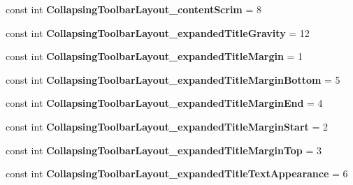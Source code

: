 \begin{DoxyCompactItemize}
const int {\bfseries Collapsing\+Toolbar\+Layout\+\_\+content\+Scrim} = 8
\item 
\mbox{\label{class_sample_app_1_1_droid_1_1_resource_1_1_styleable_a2bf064349cd2b9e1584c15a52f8f567f}} 
const int {\bfseries Collapsing\+Toolbar\+Layout\+\_\+expanded\+Title\+Gravity} = 12
\item 
\mbox{\label{class_sample_app_1_1_droid_1_1_resource_1_1_styleable_a37314f4fb8aa359cf913105ded7db64f}} 
const int {\bfseries Collapsing\+Toolbar\+Layout\+\_\+expanded\+Title\+Margin} = 1
\item 
\mbox{\label{class_sample_app_1_1_droid_1_1_resource_1_1_styleable_aee580d7480b3925d9946f643a89da7ed}} 
const int {\bfseries Collapsing\+Toolbar\+Layout\+\_\+expanded\+Title\+Margin\+Bottom} = 5
\item 
\mbox{\label{class_sample_app_1_1_droid_1_1_resource_1_1_styleable_acd4b4cb8c42aab03eb8d6d1966771dc2}} 
const int {\bfseries Collapsing\+Toolbar\+Layout\+\_\+expanded\+Title\+Margin\+End} = 4
\item 
\mbox{\label{class_sample_app_1_1_droid_1_1_resource_1_1_styleable_aa4deaf760393bde1a8bb461a9dc47811}} 
const int {\bfseries Collapsing\+Toolbar\+Layout\+\_\+expanded\+Title\+Margin\+Start} = 2
\item 
\mbox{\label{class_sample_app_1_1_droid_1_1_resource_1_1_styleable_a05b8c44c3a2226da94e30a0748b37bc4}} 
const int {\bfseries Collapsing\+Toolbar\+Layout\+\_\+expanded\+Title\+Margin\+Top} = 3
\item 
\mbox{\label{class_sample_app_1_1_droid_1_1_resource_1_1_styleable_abc792c87c733c380487d55d77de53001}} 
const int {\bfseries Collapsing\+Toolbar\+Layout\+\_\+expanded\+Title\+Text\+Appearance} = 6
\item 
\mbox{\label{class_sample_app_1_1_droid_1_1_resource_1_1_styleable_af668da874ad9556d12594bf4a063f780}} 

\end{DoxyCompactItemize}

